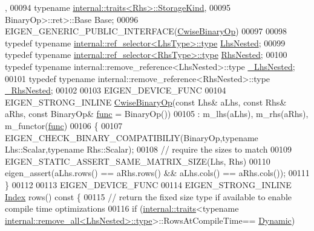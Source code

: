 \begin{DoxyCode}
      ,
00094                                                       \textcolor{keyword}{typename} 
      \hyperlink{struct_eigen_1_1internal_1_1traits}{internal::traits<Rhs>::StorageKind},
00095                                                       BinaryOp>::ret>::Base Base;
00096     EIGEN\_GENERIC\_PUBLIC\_INTERFACE(\hyperlink{group___core___module_class_eigen_1_1_cwise_binary_op}{CwiseBinaryOp})
00097 
00098     \textcolor{keyword}{typedef} \textcolor{keyword}{typename} \hyperlink{class_eigen_1_1internal_1_1_tensor_lazy_evaluator_writable}{internal::ref\_selector<LhsType>::type} 
      \hyperlink{class_eigen_1_1internal_1_1_tensor_lazy_evaluator_writable}{LhsNested};
00099     \textcolor{keyword}{typedef} \textcolor{keyword}{typename} \hyperlink{class_eigen_1_1internal_1_1_tensor_lazy_evaluator_writable}{internal::ref\_selector<RhsType>::type} 
      \hyperlink{class_eigen_1_1internal_1_1_tensor_lazy_evaluator_writable}{RhsNested};
00100     \textcolor{keyword}{typedef} \textcolor{keyword}{typename} internal::remove\_reference<LhsNested>::type \hyperlink{group___sparse_core___module}{\_LhsNested};
00101     \textcolor{keyword}{typedef} \textcolor{keyword}{typename} internal::remove\_reference<RhsNested>::type \hyperlink{group___sparse_core___module}{\_RhsNested};
00102 
00103     EIGEN\_DEVICE\_FUNC
00104     EIGEN\_STRONG\_INLINE \hyperlink{group___core___module_class_eigen_1_1_cwise_binary_op}{CwiseBinaryOp}(\textcolor{keyword}{const} Lhs& aLhs, \textcolor{keyword}{const} Rhs& aRhs, \textcolor{keyword}{const} BinaryOp& 
      \hyperlink{structfunc}{func} = BinaryOp())
00105       : m\_lhs(aLhs), m\_rhs(aRhs), m\_functor(\hyperlink{structfunc}{func})
00106     \{
00107       EIGEN\_CHECK\_BINARY\_COMPATIBILIY(BinaryOp,\textcolor{keyword}{typename} Lhs::Scalar,\textcolor{keyword}{typename} Rhs::Scalar);
00108       \textcolor{comment}{// require the sizes to match}
00109       EIGEN\_STATIC\_ASSERT\_SAME\_MATRIX\_SIZE(Lhs, Rhs)
00110       eigen\_assert(aLhs.rows() == aRhs.rows() && aLhs.cols() == aRhs.cols());
00111     \}
00112 
00113     EIGEN\_DEVICE\_FUNC
00114     EIGEN\_STRONG\_INLINE \hyperlink{namespace_eigen_a62e77e0933482dafde8fe197d9a2cfde}{Index} rows()\textcolor{keyword}{ const }\{
00115       \textcolor{comment}{// return the fixed size type if available to enable compile time optimizations}
00116       \textcolor{keywordflow}{if} (\hyperlink{struct_eigen_1_1internal_1_1traits}{internal::traits}<\textcolor{keyword}{typename} 
      \hyperlink{group___sparse_core___module}{internal::remove\_all<LhsNested>::type}>::RowsAtCompileTime==
      \hyperlink{namespace_eigen_ad81fa7195215a0ce30017dfac309f0b2}{Dynamic})

\end{DoxyCode}

